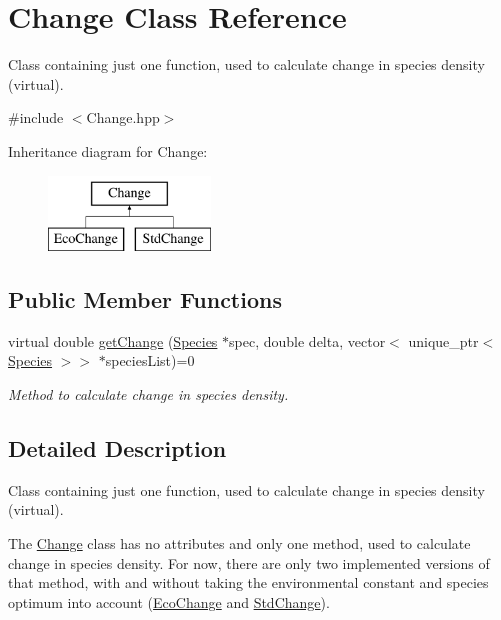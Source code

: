 \hypertarget{classChange}{}\section{Change Class Reference}
\label{classChange}


Class containing just one function, used to calculate change in species density (virtual).  




{\ttfamily \#include $<$Change.\+hpp$>$}

Inheritance diagram for Change\+:\begin{figure}[H]
\begin{center}
\leavevmode
\includegraphics[height=2.000000cm]{classChange}
\end{center}
\end{figure}
\subsection*{Public Member Functions}
\begin{DoxyCompactItemize}
\item 
virtual double \hyperlink{classChange_a59b9108e42a0aef74f735c1f82d4f014}{get\+Change} (\hyperlink{classSpecies}{Species} $\ast$spec, double delta, vector$<$ unique\+\_\+ptr$<$ \hyperlink{classSpecies}{Species} $>$$>$ $\ast$species\+List)=0
\begin{DoxyCompactList}\small\item\em Method to calculate change in species density. \end{DoxyCompactList}\end{DoxyCompactItemize}


\subsection{Detailed Description}
Class containing just one function, used to calculate change in species density (virtual). 

The \hyperlink{classChange}{Change} class has no attributes and only one method, used to calculate change in species density. For now, there are only two implemented versions of that method, with and without taking the environmental constant and species optimum into account (\hyperlink{classEcoChange}{Eco\+Change} and \hyperlink{classStdChange}{Std\+Change}). 


